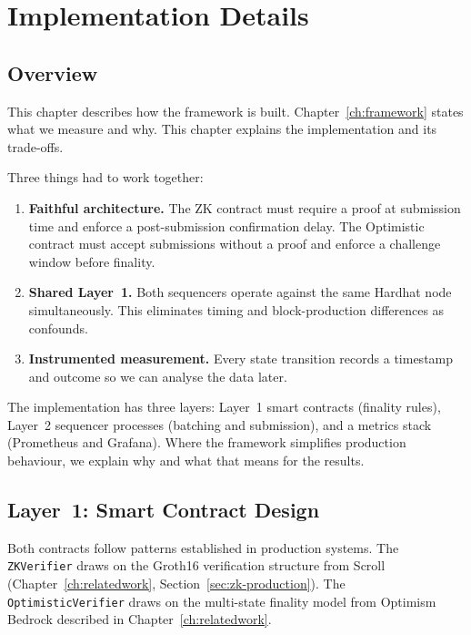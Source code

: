 \chapter{Implementation Details}
\label{ch:implementation}

\section{Overview}


This chapter describes how the framework is built. Chapter~\ref{ch:framework} states what we measure and why. This chapter explains the implementation and its trade-offs.

Three things had to work together:

\begin{enumerate}
    \item \textbf{Faithful architecture.} The ZK contract must require a proof at submission time and enforce a post-submission confirmation delay. The Optimistic contract must accept submissions without a proof and enforce a challenge window before finality.

    \item \textbf{Shared Layer~1.} Both sequencers operate against the same Hardhat node simultaneously. This eliminates timing and block-production differences as confounds.

    \item \textbf{Instrumented measurement.} Every state transition records a timestamp and outcome so we can analyse the data later.
\end{enumerate}

The implementation has three layers: Layer~1 smart contracts (finality rules), Layer~2 sequencer processes (batching and submission), and a metrics stack (Prometheus and Grafana). Where the framework simplifies production behaviour, we explain why and what that means for the results.

\section{Layer~1: Smart Contract Design}
\label{sec:l1-design}

Both contracts follow patterns established in production systems. The \texttt{ZKVerifier} draws on the Groth16 verification structure from Scroll (Chapter~\ref{ch:relatedwork}, Section~\ref{sec:zk-production}). The \texttt{OptimisticVerifier} draws on the multi-state finality model from Optimism Bedrock described in Chapter~\ref{ch:relatedwork}.

